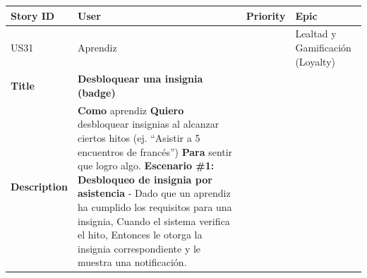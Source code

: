 {\def\LTcaptype{none} %
\begin{longtable}[]{@{}
  >{\raggedright\arraybackslash}p{}
  >{\raggedright\arraybackslash}p{}
  >{\raggedright\arraybackslash}p{}
  >{\raggedright\arraybackslash}p{}@{}}
\toprule\noalign{}
\begin{minipage}[b]{\linewidth}\raggedright
Story ID
\end{minipage} & \begin{minipage}[b]{\linewidth}\raggedright
User
\end{minipage} & \begin{minipage}[b]{\linewidth}\raggedright
Priority
\end{minipage} & \begin{minipage}[b]{\linewidth}\raggedright
Epic
\end{minipage} \\
\midrule\noalign{}
\endhead
\bottomrule\noalign{}
\endlastfoot
US31 & Aprendiz & 5 & Lealtad y Gamificación (Loyalty) \\
\textbf{Title} & \textbf{Desbloquear una insignia (badge)} & & \\
\textbf{Description} & \textbf{Como} aprendiz \textbf{Quiero}
desbloquear insignias al alcanzar ciertos hitos (ej. ``Asistir a 5
encuentros de francés'') \textbf{Para} sentir que logro algo.
\textbf{Escenario \#1: Desbloqueo de insignia por asistencia} - Dado que
un aprendiz ha cumplido los requisitos para una insignia, Cuando el
sistema verifica el hito, Entonces le otorga la insignia correspondiente
y le muestra una notificación. & & \\
\end{longtable}
}

